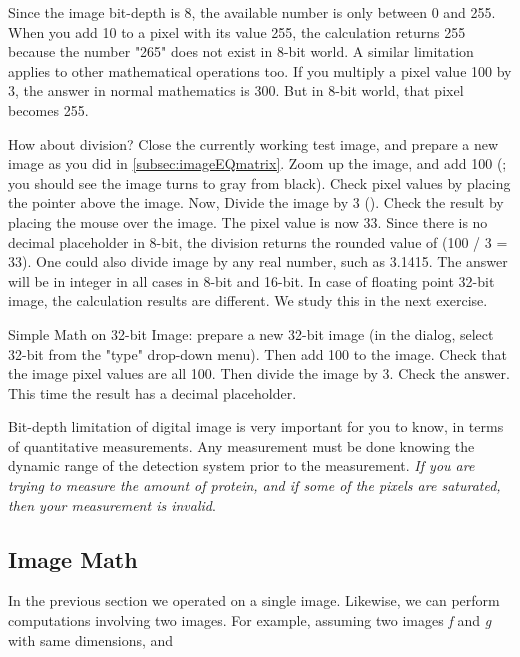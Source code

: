 \begin{indentexercise}{1}
Since the image bit-depth is 8, the available number is only between 0
and 255. When you add 10 to a pixel with its value 255, the calculation
returns 255 because the number
"265" does not exist in 8-bit
world. A similar limitation applies to other mathematical operations too. If
you multiply a pixel value 100 by 3, the answer in normal mathematics
is 300. But in 8-bit world, that pixel becomes 255. 

How about division? Close the currently working test image, and prepare
a new image as you did in \ref{subsec:imageEQmatrix}. Zoom up the image, and add 100
(; you
should see the image turns to gray from black). Check pixel values by
placing the pointer above the image. Now, Divide the image by 3
().
Check the result by placing the mouse over the image. The pixel value
is now 33. Since there is no decimal placeholder in 8-bit, the division
returns the rounded value of (100 / 3 = 33). One could also divide
image by any real number, such as 3.1415. The answer will be in integer
in all cases in 8-bit and 16-bit. In case of floating point 32-bit
image, the calculation results are different. We study this in the next
exercise. 
\end{indentexercise}

\begin{indentexercise}{2}
Simple Math on 32-bit Image: prepare a new
32-bit image (in the  dialog,
select 32-bit from the "type"
drop-down menu). Then add 100 to the image. Check that the image pixel
values are all 100. Then divide the image by 3. Check the answer. This
time the result has a decimal placeholder. 
\end{indentexercise}

Bit-depth limitation of digital image is very important for you to know,
in terms of quantitative measurements. Any measurement must be done
knowing the dynamic range of the detection system prior to the
measurement. \textit{If you are trying to measure the amount of
protein, and if some of the pixels are saturated, then your measurement
is invalid}. 

\subsection{Image Math }

In the previous section we operated on a single image. Likewise, we
can perform computations involving two images. For example, assuming two
images \textit{f} and \textit{g} with same dimensions, and 

